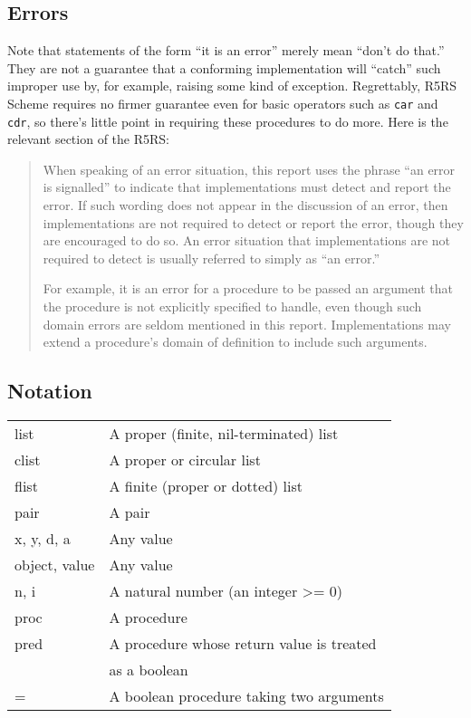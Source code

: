 \subsection{{Errors}}


Note that statements of the form ``it is an error'' merely mean ``don't
do that.'' They are not a guarantee that a conforming implementation
will ``catch'' such improper use by, for example, raising some kind of
exception. Regrettably, R5RS Scheme requires
no firmer guarantee even for basic operators such as \texttt{car} and
\texttt{cdr}, so there's little point in requiring these procedures to
do more. Here is the relevant section of the
R5RS:

\begin{quote}
When speaking of an error situation, this report uses the phrase ``an
error is signalled'' to indicate that implementations must detect and
report the error. If such wording does not appear in the discussion of
an error, then implementations are not required to detect or report the
error, though they are encouraged to do so. An error situation that
implementations are not required to detect is usually referred to simply
as ``an error.''

For example, it is an error for a procedure to be passed an argument
that the procedure is not explicitly specified to handle, even though
such domain errors are seldom mentioned in this report. Implementations
may extend a procedure's domain of definition to include such arguments.
\end{quote}


\subsection{Notation}


\begin{tabular}{ll}
list & A proper (finite, nil-terminated) list\\
clist & A proper or circular list\\
flist & A finite (proper or dotted) list\\
pair & A pair\\
x, y, d, a & Any value\\
object, value & Any value\\
n, i & A natural number (an integer \textgreater{}= 0)\\
proc & A procedure\\
pred & A procedure whose return value is treated\\
     & as a boolean\\
= & A boolean procedure taking two arguments\\
\end{tabular}

